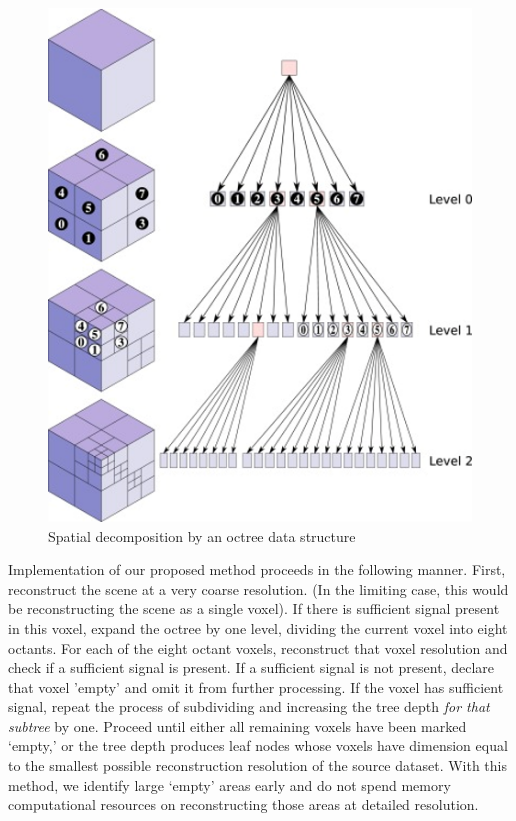 \documentclass[conference]{IEEEtran}
\begin{document}
\begin{figure}
    \centering
    \includegraphics[width=\columnwidth]{figures/octree.png}
    \caption{Spatial decomposition by an octree data structure}
    \label{fig:octree}
\end{figure}

Implementation of our proposed method proceeds in the following manner. First, reconstruct the scene at a very coarse resolution. (In the limiting case, this would be reconstructing the scene as a single voxel). If there is sufficient signal present in this voxel, expand the octree by one level, dividing the current voxel into eight octants. For each of the eight octant voxels, reconstruct that voxel resolution and check if a sufficient signal is present. If a sufficient signal is not present, declare that voxel 'empty' and omit it from further processing. If the voxel has sufficient signal, repeat the process of subdividing and increasing the tree depth \textit{for that subtree} by one. Proceed until either all remaining voxels have been marked `empty,' or the tree depth produces leaf nodes whose voxels have dimension equal to the smallest possible reconstruction resolution of the source dataset. With this method, we identify large `empty' areas early and do not spend memory computational resources on reconstructing those areas at detailed resolution.
\end{document}
